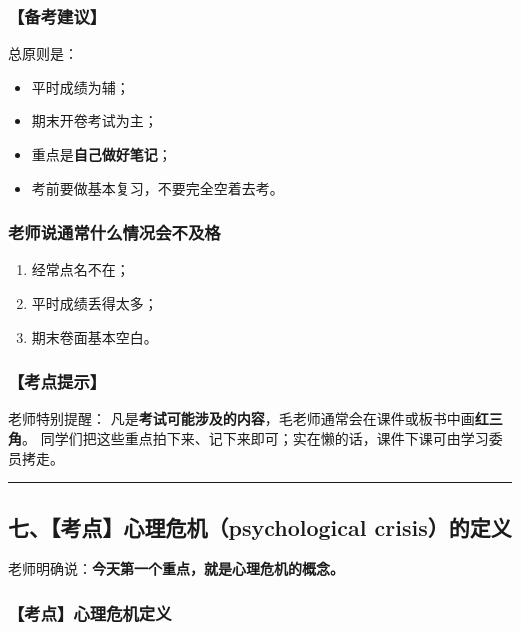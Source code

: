\documentclass[
  chinese,
  9pt,
  a4paper,
]{ctexart}
\providecommand{\tightlist}{%
  \setlength{\itemsep}{0pt}\setlength{\parskip}{0pt}}
\begin{document}
\subsubsection{【备考建议】}\label{ux5907ux8003ux5efaux8bae}

总原则是：

\begin{itemize}
\tightlist
\item
  平时成绩为辅；
\item
  期末开卷考试为主；
\item
  重点是\textbf{自己做好笔记}；
\item
  考前要做基本复习，不要完全空着去考。
\end{itemize}

\subsubsection{老师说通常什么情况会不及格}\label{ux8001ux5e08ux8bf4ux901aux5e38ux4ec0ux4e48ux60c5ux51b5ux4f1aux4e0dux53caux683c}

\begin{enumerate}
\def\labelenumi{\arabic{enumi}.}
\tightlist
\item
  经常点名不在；
\item
  平时成绩丢得太多；
\item
  期末卷面基本空白。
\end{enumerate}

\subsubsection{【考点提示】}\label{ux8003ux70b9ux63d0ux793a}

老师特别提醒：
凡是\textbf{考试可能涉及的内容}，毛老师通常会在课件或板书中画\textbf{红三角}。
同学们把这些重点拍下来、记下来即可；实在懒的话，课件下课可由学习委员拷走。

\begin{center}\rule{0.5\linewidth}{0.5pt}\end{center}

\subsection{七、【考点】心理危机（psychological
crisis）的定义}\label{ux4e03ux8003ux70b9ux5fc3ux7406ux5371ux673apsychological-crisisux7684ux5b9aux4e49}

老师明确说：\textbf{今天第一个重点，就是心理危机的概念。}

\subsubsection{【考点】心理危机定义}\label{ux8003ux70b9ux5fc3ux7406ux5371ux673aux5b9aux4e49}
\end{document}
